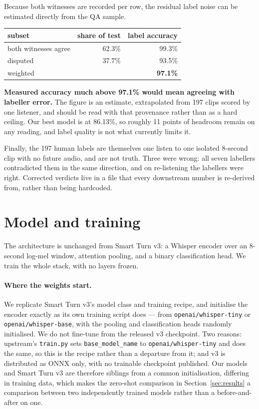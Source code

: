 \documentclass[11pt]{article}
\newcommand{\pct}{\%}
\begin{document}
Because both witnesses are recorded per row, the residual label noise can be
estimated directly from the QA sample.

\begin{center}\small
\begin{tabular}{lrr}
\toprule
subset & share of test & label accuracy \\
\midrule
both witnesses agree & 62.3\pct & 99.3\pct \\
disputed & 37.7\pct & 93.5\pct \\
\midrule
weighted & & \textbf{97.1\pct} \\
\bottomrule
\end{tabular}
\end{center}

\textbf{Measured accuracy much above 97.1\pct{} would mean agreeing with labeller
error.} The figure is an estimate, extrapolated from 197 clips scored by one
listener, and should be read with that provenance rather than as a hard ceiling.
Our best model is at 86.13\pct{}, so roughly 11 points of headroom remain on any
reading, and label quality is not what currently limits it.

Finally, the 197 human labels are themselves one listen to one isolated 8-second
clip with no future audio, and are not truth. Three were wrong: all seven
labellers contradicted them in the same direction, and on re-listening the
labellers were right. Corrected verdicts live in a file that every downstream
number is re-derived from, rather than being hardcoded.

\section{Model and training}
\label{sec:model}

The architecture is unchanged from Smart Turn v3: a Whisper encoder
\cite{whisper} over an 8-second log-mel window, attention pooling, and a binary
classification head. We train the whole stack, with no layers frozen.

\paragraph{Where the weights start.} We replicate Smart Turn v3's model class and
training recipe, and initialise the encoder exactly as its own training script
does --- from \texttt{openai/whisper-tiny} or \texttt{openai/whisper-base}, with
the pooling and classification heads randomly initialised. We do not fine-tune
from the released v3 checkpoint. Two reasons: upstream's \texttt{train.py} sets
\texttt{base\_model\_name} to \texttt{openai/whisper-tiny} and does the same, so
this is the recipe rather than a departure from it; and v3 is distributed as ONNX
only, with no trainable checkpoint published. Our models and Smart Turn v3 are
therefore siblings from a common initialisation, differing in training data, which
makes the zero-shot comparison in Section~\ref{sec:results} a comparison between
two independently trained models rather than a before-and-after on one.
\end{document}
